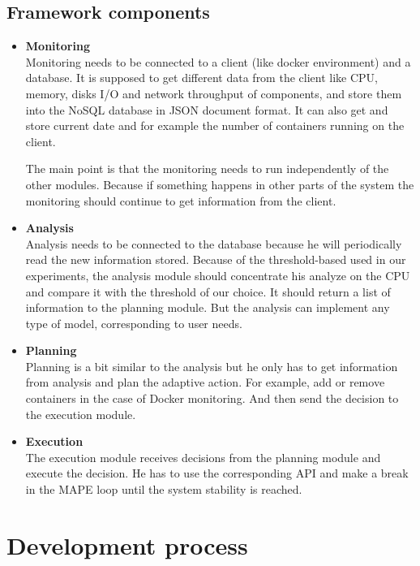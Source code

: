 \documentclass[11pt]{IEEEtran}
\begin{document}
\subsection{Framework components}
\begin{itemize}
\item \textbf{Monitoring}\\
Monitoring needs to be connected to a client (like docker environment) and
a database. It is supposed to get different data from the client like CPU, memory, disks I/O and network throughput of components, and store them into the NoSQL database in JSON document format. It can also get and store current date and for example the number of containers running on the client. 

The main point is that the monitoring needs to run independently of the other modules. Because if something happens in other parts of the system the monitoring should continue to get information from the client.

\item \textbf{Analysis}\\
Analysis needs to be connected to the database because he will periodically read the new information stored. Because of the threshold-based used in our experiments, the analysis module should concentrate his analyze on the CPU and compare it with the threshold of our choice. It should return a list of information to the planning module. But the analysis can implement any type of model, corresponding to user needs.

\item \textbf{Planning}\\
Planning is a bit similar to the analysis but he only has to get information from analysis and plan the adaptive action. For example, add or remove containers in the case of Docker monitoring. And then send the decision to the execution module.

\item \textbf{Execution}\\
The execution module receives decisions from the planning module and execute the decision. He has to use the corresponding API and make a break in the MAPE loop until the system stability is reached. 

\end{itemize}

\section{Development process}
\end{document}
